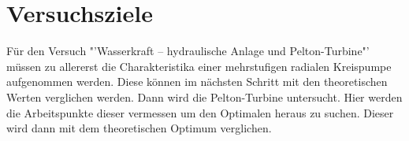 \section{Versuchsziele}
Für den Versuch "'Wasserkraft – hydraulische Anlage und Pelton-Turbine"' müssen zu allererst die Charakteristika einer mehrstufigen radialen Kreispumpe aufgenommen werden. Diese können im nächsten Schritt mit den theoretischen Werten verglichen werden. Dann wird die Pelton-Turbine untersucht. Hier werden die Arbeitspunkte dieser vermessen um den Optimalen heraus zu suchen. Dieser wird dann mit dem theoretischen Optimum verglichen.
